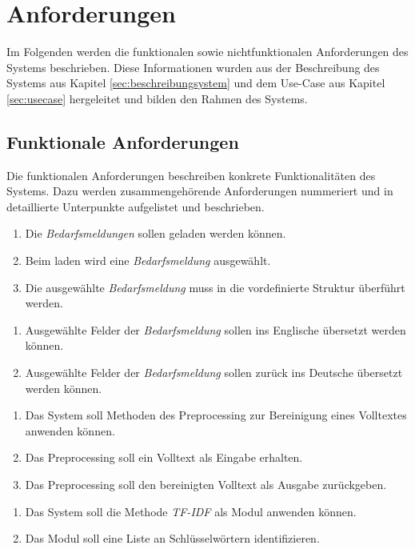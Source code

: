 \section{Anforderungen}
Im Folgenden werden die funktionalen sowie nichtfunktionalen Anforderungen des Systems beschrieben. Diese Informationen wurden aus der Beschreibung des Systems aus Kapitel \ref{sec:beschreibungsystem} und dem Use-Case aus Kapitel \ref{sec:usecase} hergeleitet und bilden den Rahmen des Systems.
\subsection{Funktionale Anforderungen}
Die funktionalen Anforderungen beschreiben konkrete Funktionalitäten des Systems. Dazu werden zusammengehörende Anforderungen nummeriert und in detaillierte Unterpunkte aufgelistet und beschrieben.
\begin{enumerate}[label=1.\arabic*]
	\item Die \emph{Bedarfsmeldungen} sollen geladen werden können.
	\item Beim laden wird eine \emph{Bedarfsmeldung} ausgewählt.
	\item Die ausgewählte \emph{Bedarfsmeldung} muss in die vordefinierte Struktur überführt werden.
\end{enumerate}
\begin{enumerate}[label=2.\arabic*]
	\item Ausgewählte Felder der \emph{Bedarfsmeldung} sollen ins Englische übersetzt werden können.
	\item Ausgewählte Felder der \emph{Bedarfsmeldung} sollen zurück ins Deutsche übersetzt werden können.
\end{enumerate}
\begin{enumerate}[label=3.\arabic*]
	\item Das System soll Methoden des Preprocessing zur Bereinigung eines Volltextes anwenden können.
	\item Das Preprocessing soll ein Volltext als Eingabe erhalten.
	\item Das Preprocessing soll den bereinigten Volltext als Ausgabe zurückgeben.
\end{enumerate}
\begin{enumerate}[label=4.\arabic*]
	\item Das System soll die Methode \emph{TF-IDF} als Modul anwenden können.
	\item Das Modul soll eine Liste an Schlüsselwörtern identifizieren.
\end{enumerate}
